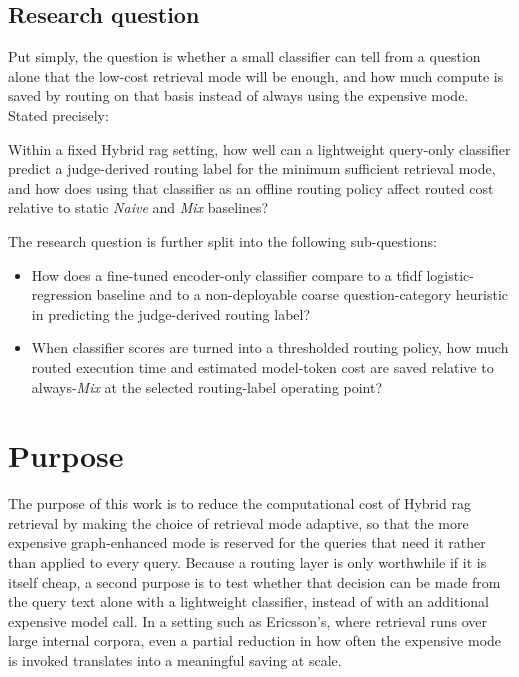 \documentclass[english, bibtex]{kththesis}               %
\numberwithin{listing}{chapter}
\providecommand{\DIFaddtex}[1]{{\protect\color{blue} \sf #1}} %
\providecommand{\DIFaddbegin}{} %
\providecommand{\DIFaddend}{} %
\providecommand{\DIFadd}[1]{\texorpdfstring{\DIFaddtex{#1}}{#1}} %
\begin{document}
\subsection{Research question}
\label{sec:researchQuestion}

\DIFaddbegin \DIFadd{Put simply, the question is whether a small classifier can tell from a question alone that the low-cost retrieval mode will be enough, and how much compute is saved by routing on that basis instead of always using the expensive mode. Stated precisely:
}

\DIFaddend Within a fixed Hybrid \gls{rag} setting, how well can a lightweight query-only classifier predict a judge-derived routing label for the minimum sufficient retrieval mode, and how does using that classifier as an offline routing policy affect routed cost relative to static \emph{Naive} and \emph{Mix} baselines?

The research question is further split into the following sub-questions:

\begin{itemize}
    \item How does a fine-tuned encoder-only classifier compare to a \gls{tfidf} logistic-regression baseline and to a non-deployable coarse question-category heuristic in predicting the judge-derived routing label?
    \item When classifier scores are turned into a thresholded routing policy, how much routed execution time and estimated model-token cost are saved relative to always-\emph{Mix} at the selected routing-label operating point?
\end{itemize}

\section{Purpose}
\label{sec:purpose}
The purpose of this work is to reduce the computational cost of Hybrid \gls{rag} retrieval by making the choice of retrieval mode adaptive, so that the more expensive graph-enhanced mode is reserved for the queries that need it rather than applied to every query. Because a routing layer is only worthwhile if it is itself cheap, a second purpose is to test whether that decision can be made from the query text alone with a lightweight classifier, instead of with an additional expensive model call. In a setting such as Ericsson's, where retrieval runs over large internal corpora, even a partial reduction in how often the expensive mode is invoked translates into a meaningful saving at scale.
\end{document}
